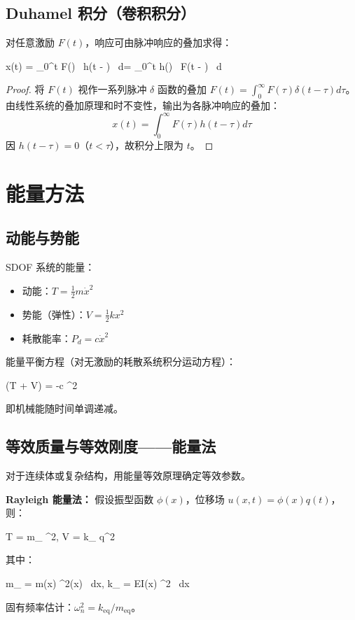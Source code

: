 \subsection{Duhamel 积分（卷积积分）}

对任意激励 $F(t)$，响应可由脉冲响应的叠加求得：
\begin{myformula}
	x(t) = \int_{0}^{t} F(\tau) \, h(t - \tau) \, d\tau = \int_{0}^{t} h(\tau) \, F(t - \tau) \, d\tau
\end{myformula}

\begin{proof}
	将 $F(t)$ 视作一系列脉冲 $\delta$ 函数的叠加 $F(t) = \int_{0}^{\infty} F(\tau) \delta(t - \tau) d\tau$。由线性系统的叠加原理和时不变性，输出为各脉冲响应的叠加：
	\[
	x(t) = \int_{0}^{\infty} F(\tau) h(t - \tau) d\tau
	\]
	因 $h(t - \tau) = 0$（$t < \tau$），故积分上限为 $t$。
\end{proof}

\section{能量方法}

\subsection{动能与势能}

SDOF 系统的能量：
\begin{itemize}
	\item 动能：$T = \frac{1}{2} m \dot{x}^2$
	\item 势能（弹性）：$V = \frac{1}{2} k x^2$
	\item 耗散能率：$P_d = c \dot{x}^2$
\end{itemize}

能量平衡方程（对无激励的耗散系统积分运动方程）：
\begin{myformula}
	(T + V) = -c ^2 
\end{myformula}
即机械能随时间单调递减。

\subsection{等效质量与等效刚度——能量法}

对于连续体或复杂结构，用能量等效原理确定等效参数。

\textbf{Rayleigh 能量法：} 假设振型函数 $\phi(x)$，位移场 $u(x,t) = \phi(x) q(t)$，则：
\begin{myformula}
	T =  m_{} ^2, \qquad V =  k_{} q^2
\end{myformula}
其中：
\begin{myformula}
	m_{} = \int m(x) \phi^2(x) \, dx, \qquad
	k_{} = \int EI(x) ^2 \, dx
\end{myformula}
固有频率估计：$\omega_n^2 = k_{\text{eq}} / m_{\text{eq}}$。

